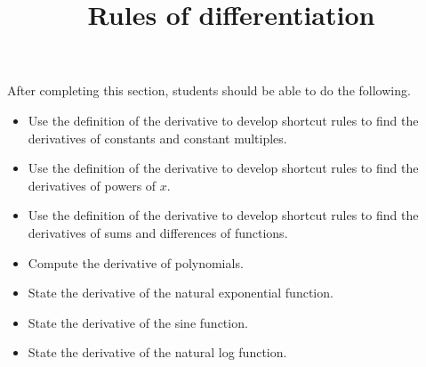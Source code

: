 \documentclass{ximera}
\title{Rules of differentiation}
\begin{document}
\begin{abstract}
\end{abstract}

\maketitle

\begin{sectionOutcomes}

After completing this section, students should be able to do the following.

\begin{itemize}
	\item Use the definition of the derivative to develop shortcut rules to find the derivatives of constants and constant multiples.
	\item Use the definition of the derivative to develop shortcut rules to find the derivatives of powers of $x$.
	\item Use the definition of the derivative to develop shortcut rules to find the derivatives of sums and differences of functions.
        \item Compute the derivative of polynomials.
        \item State the derivative of the natural exponential function.
	\item State the derivative of the sine function.
	\item State the derivative of the natural log function.
\end{itemize}

\end{sectionOutcomes}
\end{document}
